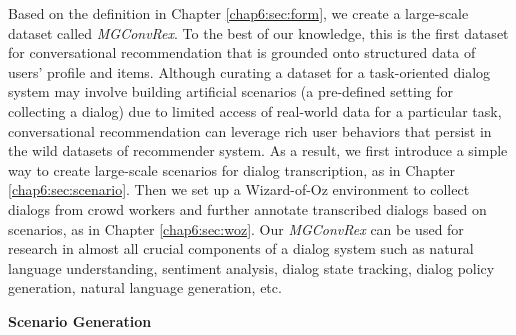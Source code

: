 Based on the definition in Chapter \ref{chap6:sec:form}, we create a large-scale dataset called \textit{MGConvRex}.
To the best of our knowledge, this is the first dataset for conversational recommendation that is grounded onto structured data of users' profile and items.
Although curating a dataset for a task-oriented dialog system may involve building artificial scenarios (a pre-defined setting for collecting a dialog) \cite{li2016user,li2018microsoft} due to limited access of real-world data for a particular task, conversational recommendation can leverage rich user behaviors that persist in the wild datasets of recommender system.  
As a result, we first introduce a simple way to create large-scale scenarios for dialog transcription, as in Chapter \ref{chap6:sec:scenario}.
Then we set up a Wizard-of-Oz environment \cite{dstc2,woz,multiwoz,multiwoz2.1} to collect dialogs from crowd workers and further annotate transcribed dialogs based on scenarios, as in Chapter \ref{chap6:sec:woz}.
Our \textit{MGConvRex} can be used for research in almost all crucial components of a dialog system such as natural language understanding, sentiment analysis, dialog state tracking, dialog policy generation, natural language generation, etc.

\textbf{Scenario Generation}
\label{chap6:sec:scenario}

